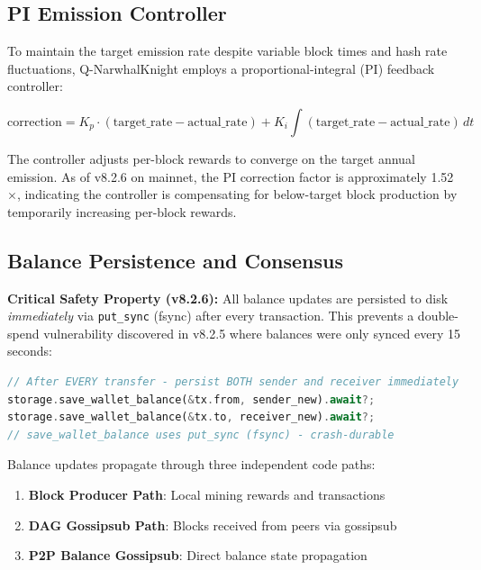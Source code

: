 \documentclass[11pt,a4paper]{article}
\begin{document}
\subsection{PI Emission Controller}

To maintain the target emission rate despite variable block times and hash rate fluctuations, Q-NarwhalKnight employs a proportional-integral (PI) feedback controller:

\begin{equation}
\text{correction} = K_p \cdot (\text{target\_rate} - \text{actual\_rate}) + K_i \int (\text{target\_rate} - \text{actual\_rate})\,dt
\end{equation}

The controller adjusts per-block rewards to converge on the target annual emission. As of v8.2.6 on mainnet, the PI correction factor is approximately 1.52$\times$, indicating the controller is compensating for below-target block production by temporarily increasing per-block rewards.

\subsection{Balance Persistence and Consensus}

\textbf{Critical Safety Property (v8.2.6):} All balance updates are persisted to disk \textit{immediately} via \texttt{put\_sync} (fsync) after every transaction. This prevents a double-spend vulnerability discovered in v8.2.5 where balances were only synced every 15 seconds:

\begin{lstlisting}[language=Rust, caption={Immediate balance persistence (v8.2.6 fix)}]
// After EVERY transfer - persist BOTH sender and receiver immediately
storage.save_wallet_balance(&tx.from, sender_new).await?;
storage.save_wallet_balance(&tx.to, receiver_new).await?;
// save_wallet_balance uses put_sync (fsync) - crash-durable
\end{lstlisting}

Balance updates propagate through three independent code paths:
\begin{enumerate}
    \item \textbf{Block Producer Path}: Local mining rewards and transactions
    \item \textbf{DAG Gossipsub Path}: Blocks received from peers via gossipsub
    \item \textbf{P2P Balance Gossipsub}: Direct balance state propagation
\end{enumerate}
\end{document}
